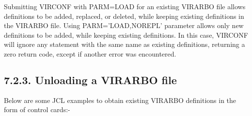 \documentclass[letterpaper,10pt,english]{sphinxmanual}
\begin{document}
\begin{sphinxVerbatim}[commandchars=\\\{\}]
  
      
  
  
  
  
  
         
         
\end{sphinxVerbatim}


Submitting VIRCONF with PARM=LOAD for an existing VIRARBO file allows definitions to be added, replaced, or deleted, while keeping existing definitions in the VIRARBO file. Using PARM=’LOAD,NOREPL’ parameter allows only new definitions to be added, while keeping existing definitions. In this case, VIRCONF will ignore any statement with the same name as existing definitions, returning a zero return code, except if another error was encountered.


\subsection{7.2.3. Unloading a VIRARBO file}
\label{\detokenize{Installation_Guide:unloading-a-virarbo-file}}
Below are some JCL examples to obtain existing VIRARBO definitions in the form of control cards:-
\end{document}
